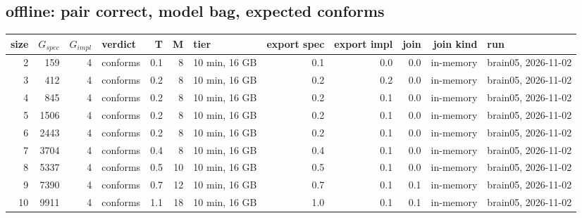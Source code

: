 \documentclass[10pt]{article}
\begin{document}
\subsection*{offline: pair \textsf{correct}, model bag, expected conforms}
\begin{longtable}{@{}rrrlrrlrrrrl@{}}
\toprule
size & $G_{\mathit{spec}}$ & $G_{\mathit{impl}}$ & verdict & T & M & tier & export spec & export impl & join & join kind & run \\
\midrule
\endhead
\color{red} 2 & 159 & 4 & conforms & 0.1 & 8 & 10 min, 16 GB & 0.1 & 0.0 & 0.0 & in-memory & brain05, 2026-11-02 \\
\color{red} 3 & 412 & 4 & conforms & 0.2 & 8 & 10 min, 16 GB & 0.2 & 0.2 & 0.0 & in-memory & brain05, 2026-11-02 \\
\color{red} 4 & 845 & 4 & conforms & 0.2 & 8 & 10 min, 16 GB & 0.2 & 0.1 & 0.0 & in-memory & brain05, 2026-11-02 \\
\color{red} 5 & 1506 & 4 & conforms & 0.2 & 8 & 10 min, 16 GB & 0.2 & 0.1 & 0.0 & in-memory & brain05, 2026-11-02 \\
\color{red} 6 & 2443 & 4 & conforms & 0.2 & 8 & 10 min, 16 GB & 0.2 & 0.1 & 0.0 & in-memory & brain05, 2026-11-02 \\
\color{red} 7 & 3704 & 4 & conforms & 0.4 & 8 & 10 min, 16 GB & 0.4 & 0.1 & 0.0 & in-memory & brain05, 2026-11-02 \\
\color{red} 8 & 5337 & 4 & conforms & 0.5 & 10 & 10 min, 16 GB & 0.5 & 0.1 & 0.0 & in-memory & brain05, 2026-11-02 \\
\color{red} 9 & 7390 & 4 & conforms & 0.7 & 12 & 10 min, 16 GB & 0.7 & 0.1 & 0.1 & in-memory & brain05, 2026-11-02 \\
\color{red} 10 & 9911 & 4 & conforms & 1.1 & 18 & 10 min, 16 GB & 1.0 & 0.1 & 0.1 & in-memory & brain05, 2026-11-02 \\
\bottomrule
\end{longtable}
\end{document}
